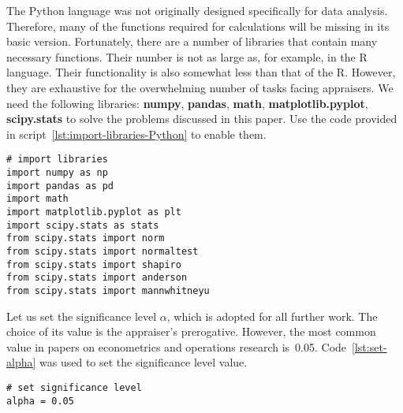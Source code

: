 \documentclass[]{scrreprt}
\begin{document}
The Python language was not originally designed specifically for data analysis. Therefore, many of the functions required for calculations will be missing in its basic version. Fortunately, there are a number of libraries that contain many necessary functions. Their number is not as large as, for example, in the R language. Their functionality is also somewhat less than that of the R. However, they are exhaustive for the overwhelming number of tasks facing appraisers. We need the following libraries: \textbf{numpy}, \textbf{pandas},\textbf{ math}, \textbf{matplotlib.pyplot}, \textbf{scipy.stats} to solve the problems discussed in this paper. Use the code provided in script~\ref{lst:import-libraries-Python} to enable them.
\begin{lstlisting}[float, caption = Enabling the required libraries, firstnumber=1, label= lst:import-libraries-Python]
# import libraries
import numpy as np
import pandas as pd
import math
import matplotlib.pyplot as plt
import scipy.stats as stats
from scipy.stats import norm
from scipy.stats import normaltest
from scipy.stats import shapiro
from scipy.stats import anderson
from scipy.stats import mannwhitneyu
\end{lstlisting}
%

Let us set the significance level $\alpha$, which is adopted for all further work. The choice of its value is the appraiser's prerogative. However, the most common value in papers on econometrics and operations research is~0.05. Code~\ref{lst:set-alpha} was used to set the significance level value.
%
\begin{lstlisting}[float, caption = Set the applicable level of significance, firstnumber=1, label= lst:set-alpha]
# set significance level
alpha = 0.05
\end{lstlisting}
% 
\end{document}
